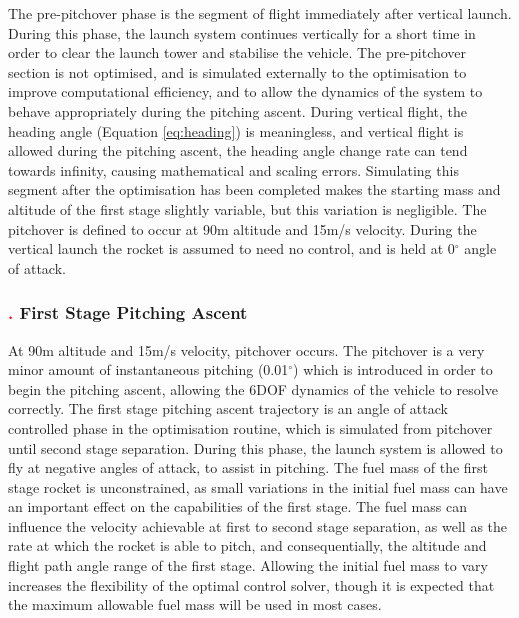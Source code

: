  The pre-pitchover phase is the segment of flight immediately after vertical launch. During this phase, the launch system continues vertically for a short time in order to clear the launch tower and stabilise the vehicle.        
The pre-pitchover section is not optimised, and is simulated externally to the optimisation to improve computational efficiency, and to allow the dynamics of the system to behave appropriately during the pitching ascent. During vertical flight, the heading angle (Equation \ref{eq:heading}) is meaningless, and vertical flight is allowed during the pitching ascent, the heading angle change rate can tend towards infinity, causing mathematical and scaling errors. Simulating this segment after the optimisation has been completed makes the starting mass and altitude of the first stage slightly variable, but this variation is negligible. 
The pitchover is defined to occur at 90m altitude and 15m/s velocity.
During the vertical launch the rocket is assumed to need no control, and is held at 0$^\circ$ angle of attack. 

\subsubsection{\textcolor{red}{.} First Stage Pitching Ascent}

At 90m altitude and 15m/s velocity, pitchover occurs. The pitchover is a very minor amount of instantaneous pitching (0.01$^\circ$) which is introduced in order to begin the pitching ascent, allowing the 6DOF dynamics of the vehicle to resolve correctly. 
The first stage pitching ascent trajectory is an angle of attack controlled phase in the optimisation routine, which is simulated from pitchover until second stage separation. During this phase, the launch system is allowed to fly at negative angles of attack, to assist in pitching. 
The fuel mass of the first stage rocket is unconstrained, as small variations in the initial fuel mass can have an important effect on the capabilities of the first stage. The fuel mass can influence the velocity achievable at first to second stage separation, as well as the rate at which the rocket is able to pitch, and consequentially, the altitude and flight path angle range of the first stage.
Allowing the initial fuel mass to vary increases the flexibility of the optimal control solver, though it is expected that the maximum allowable fuel mass will be used in most cases. 



